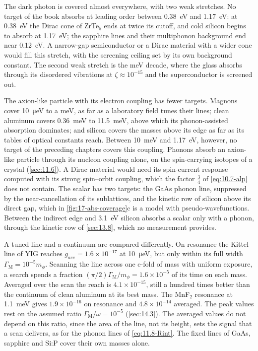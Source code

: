 The dark photon is covered almost everywhere, with two weak stretches. No target of the book absorbs at leading order between \SI{0.38}{eV} and \SI{1.17}{eV}: at \SI{0.38}{eV} the Dirac cone of ZrTe$_5$ ends at twice its cutoff, and cold silicon begins to absorb at \SI{1.17}{eV}; the sapphire lines and their multiphonon background end near \SI{0.12}{eV}. A narrow-gap semiconductor or a Dirac material with a wider cone would fill this stretch, with the screening ceiling set by its own background constant. The second weak stretch is the meV decade, where the glass absorbs through its disordered vibrations at $\zeta \approx 10^{-15}$ and the superconductor is screened out.

The axion-like particle with its electron coupling has fewer targets. Magnons cover \SI{10}{\micro eV} to a meV, as far as a laboratory field tunes their lines; clean aluminum covers \SI{0.36}{meV} to \SI{11.5}{meV}, above which its phonon-assisted absorption dominates; and silicon covers the masses above its edge as far as its tables of optical constants reach. Between \SI{10}{meV} and \SI{1.17}{eV}, however, no target of the preceding chapters covers this coupling. Phonons absorb an axion-like particle through its nucleon coupling alone, on the spin-carrying isotopes of a crystal (\cref{sec:11.6}). A Dirac material would need its spin-current response computed with its strong spin--orbit coupling, which the factor $\frac34$ of \cref{eq:10.7-alp} does not contain. The scalar has two targets: the GaAs phonon line, suppressed by the near-cancellation of its sublattices, and the kinetic row of silicon above its direct gap, which in \cref{fig:17-abs-coverage}c is a model with pseudo-wavefunctions. Between the indirect edge and \SI{3.1}{eV} silicon absorbs a scalar only with a phonon, through the kinetic row of \cref{sec:13.8}, which no measurement provides.

A tuned line and a continuum are compared differently. On resonance the Kittel line of YIG reaches $g_{aee} = 1.6\times10^{-17}$ at \SI{10}{\micro eV}, but only within its full width $\varGamma_{\mathrm{M}} = 10^{-5}m_\phi$. Scanning the line across one e-fold of mass with uniform exposure, a search spends a fraction $(\pi/2)\varGamma_{\mathrm{M}}/m_\phi = 1.6\times10^{-5}$ of its time on each mass. Averaged over the scan the reach is $4.1\times10^{-15}$, still a hundred times better than the continuum of clean aluminum at its best mass. The MnF$_2$ resonance at \SI{1.1}{meV} gives $1.9\times10^{-16}$ on resonance and $4.8\times10^{-14}$ averaged. The peak values rest on the assumed ratio $\varGamma_{\mathrm{M}}/\omega = 10^{-5}$ (\cref{sec:14.3}). The averaged values do not depend on this ratio, since the area of the line, not its height, sets the signal that a scan delivers, as for the phonon lines of \cref{eq:11.8-Rint}. The fixed lines of GaAs, sapphire and Si:P cover their own masses alone.

